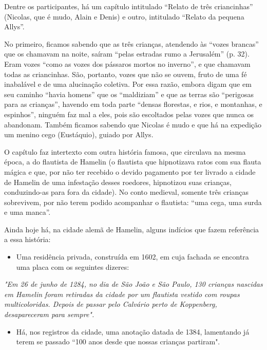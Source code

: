 \documentclass[12pt]{extarticle}
\begin{document}
Dentre os participantes, há um capítulo intitulado ``Relato de três
criancinhas'' (Nicolas, que é mudo, Alain e Denis) e outro, intitulado
``Relato da pequena Allys''.

No primeiro, ficamos sabendo que as três crianças, atendendo às ``vozes
brancas'' que os chamavam na noite, saíram ``pelas estradas rumo a
Jerusalém'' (p. 32). Eram vozes ``como as vozes dos pássaros mortos no
inverno'', e que chamavam todas as criancinhas. São, portanto, vozes que
não se ouvem, fruto de uma fé inabalável e de uma alucinação coletiva.
Por essa razão, embora digam que em seu caminho ``havia homens'' que os
``maldiziam'' e que as terras são ``perigosas para as crianças'',
havendo em toda parte ``densas florestas, e rios, e montanhas, e
espinhos'', ninguém faz mal a eles, pois são escoltados pelas vozes que
nunca os abandonam. Também ficamos sabendo que Nicolas é mudo e que há
na expedição um menino cego (Eustáquio), guiado por Allys.

O capítulo faz intertexto com outra história famosa, que circulava na
mesma época, a do flautista de Hamelin (o flautista que hipnotizava
ratos com sua flauta mágica e que, por não ter recebido o devido
pagamento por ter livrado a cidade de Hamelin de uma infestação desses
roedores, hipnotizou suas crianças, conduzindo-as para fora da cidade).
No conto medieval, somente três crianças sobrevivem, por não terem
podido acompanhar o flautista: ``uma cega, uma surda e uma manca''.




Ainda hoje há, na cidade alemã de Hamelin, alguns indícios que fazem
referência a essa história:

\begin{itemize}
\item
  Uma residência privada, construída em 1602, em cuja fachada se
  encontra uma placa com os seguintes dizeres:
\end{itemize}

\emph{"Em 26 de junho de 1284, no dia de São João e São Paulo, 130
crianças nascidas em Hamelin foram retiradas da cidade por um flautista
vestido com roupas multicoloridas. Depois de passar pelo Calvário perto
de Koppenberg, desapareceram para sempre".}



\begin{itemize}
\item
  Há, nos registros da cidade, uma anotação datada de 1384, lamentando
  já terem se passado ``100 anos desde que nossas crianças partiram".
\end{itemize}
\end{document}

